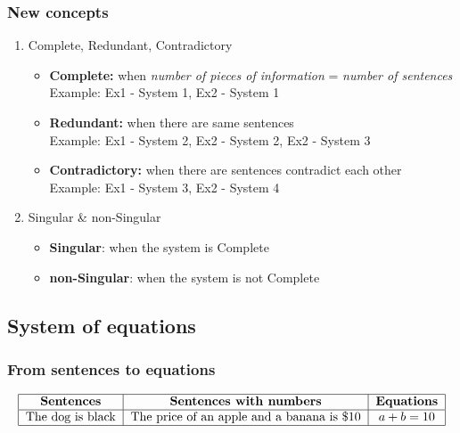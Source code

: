 \documentclass[12pt,a4paper]{article}
\begin{document}
\subsubsection{New concepts}
\begin{enumerate}
    \item Complete, Redundant, Contradictory
          \begin{itemize}
              \item \textbf{Complete:} when \textit{number of pieces of information} = \textit{number of sentences}\\Example: Ex1 - System 1, Ex2 - System 1
              \item \textbf{Redundant:} when there are same sentences\\Example: Ex1 - System 2, Ex2 - System 2, Ex2 - System 3
              \item \textbf{Contradictory:} when there are sentences contradict each other\\Example: Ex1 - System 3, Ex2 - System 4
          \end{itemize}
    \item Singular \& non-Singular
          \begin{itemize}
              \item \textbf{Singular}: when the system is Complete
              \item \textbf{non-Singular}: when the system is not Complete
          \end{itemize}
\end{enumerate}

\subsection{System of equations}

\subsubsection{From sentences to equations}
\begin{align*}
    \begin{tabular}{|c|c|c|}
        \hline
        \textbf{Sentences} & \textbf{Sentences with numbers}            & \textbf{Equations} \\
        \hline
        The dog is black   & The price of an apple and a banana is \$10 & $a + b = 10$       \\
        \hline
    \end{tabular}
\end{align*}
\end{document}

